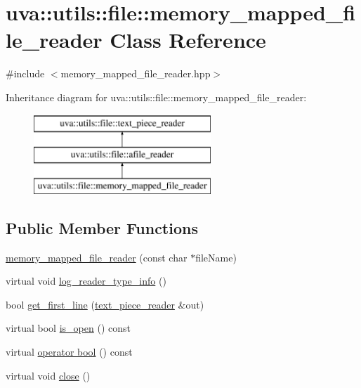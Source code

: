 \hypertarget{classuva_1_1utils_1_1file_1_1memory__mapped__file__reader}{}\section{uva\+:\+:utils\+:\+:file\+:\+:memory\+\_\+mapped\+\_\+file\+\_\+reader Class Reference}
\label{classuva_1_1utils_1_1file_1_1memory__mapped__file__reader}


{\ttfamily \#include $<$memory\+\_\+mapped\+\_\+file\+\_\+reader.\+hpp$>$}

Inheritance diagram for uva\+:\+:utils\+:\+:file\+:\+:memory\+\_\+mapped\+\_\+file\+\_\+reader\+:\begin{figure}[H]
\begin{center}
\leavevmode
\includegraphics[height=3.000000cm]{classuva_1_1utils_1_1file_1_1memory__mapped__file__reader}
\end{center}
\end{figure}
\subsection*{Public Member Functions}
\begin{DoxyCompactItemize}
\item 
\hyperlink{classuva_1_1utils_1_1file_1_1memory__mapped__file__reader_a25cc1f08c01bb10ebf9911774e2be339}{memory\+\_\+mapped\+\_\+file\+\_\+reader} (const char $\ast$file\+Name)
\item 
virtual void \hyperlink{classuva_1_1utils_1_1file_1_1memory__mapped__file__reader_a077713a9e282b5ac04d79481c9bef5cb}{log\+\_\+reader\+\_\+type\+\_\+info} ()
\item 
bool \hyperlink{classuva_1_1utils_1_1file_1_1memory__mapped__file__reader_af43c82bb302a42220cdfc0b86b05a229}{get\+\_\+first\+\_\+line} (\hyperlink{classuva_1_1utils_1_1file_1_1text__piece__reader}{text\+\_\+piece\+\_\+reader} \&out)
\item 
virtual bool \hyperlink{classuva_1_1utils_1_1file_1_1memory__mapped__file__reader_a7caf2da4a6f9921f79174f9e70ab33a9}{is\+\_\+open} () const 
\item 
virtual \hyperlink{classuva_1_1utils_1_1file_1_1memory__mapped__file__reader_ad0bf225d433850cfe9d6de9dda4aae99}{operator bool} () const 
\item 
virtual void \hyperlink{classuva_1_1utils_1_1file_1_1memory__mapped__file__reader_ac61667c9806d9090393c545359f17154}{close} ()
\end{DoxyCompactItemize}
